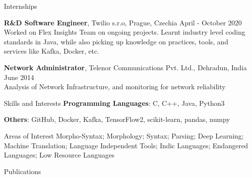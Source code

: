 \documentclass{resume} %
\begin{document}
\begin{rSection}{Internships}

    {\textbf{R\&D Software Engineer}, Twilio s.r.o, Prague, Czechia} 
        \hfill {April - October 2020}\\
            Worked on Flex Insights Team on ongoing projects. Learnt industry level coding 
            standards in Java, while also picking up knowledge on practices, tools, and services like Kafka, Docker, etc.
    
    {\textbf{Network Administrator}, Telenor Communications Pvt. Ltd., Dehradun, India} 
        \hfill {June 2014}\\
            Analysis of Network Infrastructure, and monitoring for network reliability

\end{rSection}


\begin{rSection}{Skills and Interests}
    {\textbf{Programming Languages}: C, C++, Java, Python3}
    
    {\textbf{Others}: GitHub, Docker, Kafka, TensorFlow2, scikit-learn, pandas, numpy}
    
    \begin{rSubsection}{Areas of Interest}{}{}{}
        Morpho-Syntax; Morphology; Syntax; Parsing; Deep Learning; Machine Translation; 
        Language Independent Tools; Indic Languages; Endangered Languages; Low Resource 
        Languages
    \end{rSubsection}
\end{rSection}


\begin{rSection}{Publications}

    {}

    {}

    {}
    
    {}

    {}

\end{rSection}
\end{document}
